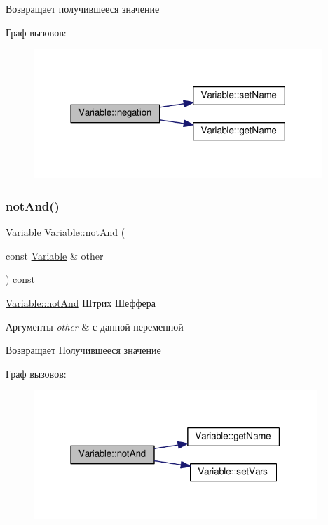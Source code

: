 \begin{DoxyReturn}{Возвращает}
получившееся значение 
\end{DoxyReturn}
Граф вызовов\+:\nopagebreak
\begin{figure}[H]
\begin{center}
\leavevmode
\includegraphics[width=309pt]{class_variable_a7f2a3b1b8540781703f5435253171978_cgraph}
\end{center}
\end{figure}
\mbox{\label{class_variable_a5b1b5220dae873cc4bf6d0700eba703e}} 
\subsubsection{\texorpdfstring{not\+And()}{notAnd()}}
{\footnotesize\ttfamily \hyperlink{class_variable}{Variable} Variable\+::not\+And (\begin{DoxyParamCaption}\item[{const \hyperlink{class_variable}{Variable} \&}]{other }\end{DoxyParamCaption}) const}



\hyperlink{class_variable_a5b1b5220dae873cc4bf6d0700eba703e}{Variable\+::not\+And} Штрих Шеффера 


\begin{DoxyParams}{Аргументы}
{\em other} & с данной переменной \\
\hline
\end{DoxyParams}
\begin{DoxyReturn}{Возвращает}
Получившееся значение 
\end{DoxyReturn}
Граф вызовов\+:\nopagebreak
\begin{figure}[H]
\begin{center}
\leavevmode
\includegraphics[width=303pt]{class_variable_a5b1b5220dae873cc4bf6d0700eba703e_cgraph}
\end{center}
\end{figure}
\mbox{\label{class_variable_aa71e11142a257fa6676257843879148c}} 
